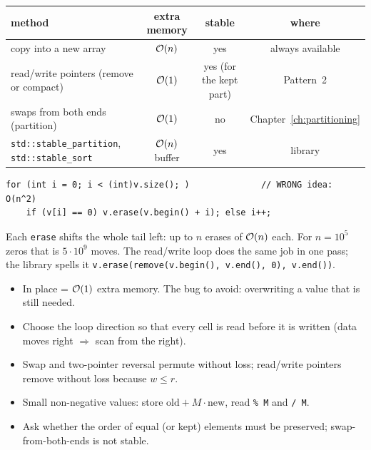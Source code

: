 \begin{table}[H]
\centering\small
\renewcommand{\arraystretch}{1.2}
\begin{tabular}{@{}lccc@{}}
\toprule
\textbf{method} & \textbf{extra memory} & \textbf{stable} & \textbf{where} \\
\midrule
copy into a new array & $\mathcal{O}(n)$ & yes & always available \\
read/write pointers (remove or compact) & $\mathcal{O}(1)$ & yes (for the kept part) & Pattern~2 \\
swaps from both ends (partition) & $\mathcal{O}(1)$ & no & Chapter~\ref{ch:partitioning} \\
\texttt{std::stable\_partition}, \texttt{std::stable\_sort} & $\mathcal{O}(n)$ buffer & yes & library \\
\bottomrule
\end{tabular}
\end{table}

\begin{warningbox}
\begin{lstlisting}[style=snippet]
for (int i = 0; i < (int)v.size(); )              // WRONG idea: O(n^2)
    if (v[i] == 0) v.erase(v.begin() + i); else i++;
\end{lstlisting}
Each \texttt{erase} shifts the whole tail left: up to $n$ erases of $\mathcal{O}(n)$ each. For $n = 10^5$ zeros that is $5\cdot10^9$ moves. The read/write loop does the same job in one pass; the library spells it \texttt{v.erase(remove(v.begin(), v.end(), 0), v.end())}.
\end{warningbox}

\begin{checklistbox}
\begin{itemize}[leftmargin=*]
    \item[$\square$] In place = $\mathcal{O}(1)$ extra memory. The bug to avoid: overwriting a value that is still needed.
    \item[$\square$] Choose the loop direction so that every cell is read before it is written (data moves right $\Rightarrow$ scan from the right).
    \item[$\square$] Swap and two-pointer reversal permute without loss; read/write pointers remove without loss because $w \le r$.
    \item[$\square$] Small non-negative values: store $\text{old} + M\cdot\text{new}$, read \texttt{\% M} and \texttt{/ M}.
    \item[$\square$] Ask whether the order of equal (or kept) elements must be preserved; swap-from-both-ends is not stable.
\end{itemize}
\end{checklistbox}
